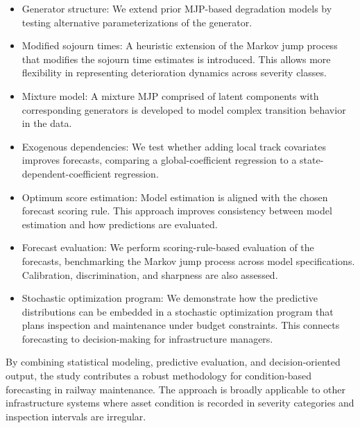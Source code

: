 \documentclass{article}
\begin{document}
\begin{itemize}
    \item Generator structure: We extend prior MJP-based degradation models by testing alternative parameterizations of the generator.    
    \item Modified sojourn times: A heuristic extension of the Markov jump process that modifies the sojourn time estimates is introduced. This allows more flexibility in representing deterioration dynamics across severity classes.
      \item Mixture model: A mixture MJP comprised of latent components with corresponding generators is developed to model complex transition behavior in the data.
    \item Exogenous dependencies: We test whether adding local track covariates improves forecasts, comparing a global-coefficient regression to a state-dependent-coefficient regression.
     \item Optimum score estimation: Model estimation is aligned with the chosen forecast scoring rule. This approach improves consistency between model estimation and how predictions are evaluated.
     \item Forecast evaluation: We perform scoring-rule-based evaluation of the forecasts, benchmarking the Markov jump process across model specifications. Calibration, discrimination, and sharpness are also assessed. \item Stochastic optimization program: We demonstrate how the predictive distributions can be embedded in a stochastic optimization program that plans inspection and maintenance under budget constraints. This connects forecasting to decision-making for infrastructure managers.
\end{itemize}

By combining statistical modeling, predictive evaluation, and decision-oriented output, the study contributes a robust methodology for condition-based forecasting in railway maintenance. The approach is broadly applicable to other infrastructure systems where asset condition is recorded in severity categories and inspection intervals are irregular.
\end{document}
